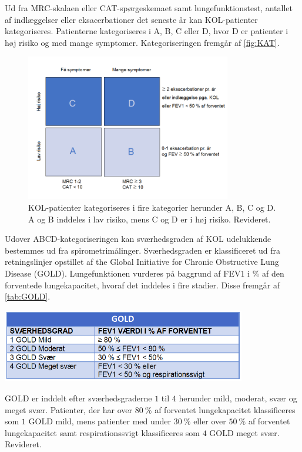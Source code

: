 \noindent
Ud fra MRC-skalaen eller CAT-spørgeskemaet samt lungefunktionstest, antallet af indlæggelser eller eksacerbationer det seneste år kan KOL-patienter kategoriseres. Patienterne kategoriseres i A, B, C eller D, hvor D er patienter i høj risiko og med mange symptomer. Kategoriseringen fremgår af \autoref{fig:KAT}.

\begin{figure} [H]
\centering
\includegraphics[width=0.8\textwidth]{figures/KAT}
\caption{KOL-patienter kategoriseres i fire kategorier herunder A, B, C og D. A og B inddeles i lav risiko, mens C og D er i høj risiko. Revideret\cite{Basisbogen2016}.}
\label{fig:KAT}
\end{figure} 
 
\noindent
Udover ABCD-kategoriseringen kan sværhedsgraden af KOL udelukkende bestemmes ud fra spirometrimålinger.  Sværhedsgraden er klassificeret ud fra retningslinjer opstillet af the Global Initiative for Chronic Obstructive Lung Disease (GOLD).\cite{dsam2016} Lungefunktionen vurderes på baggrund af FEV$1$ i \% af den forventede lungekapacitet, hvoraf det inddeles i fire stadier. Disse fremgår af \autoref{tab:GOLD}.

\begin{table} [H]
\centering
\includegraphics[width=0.8\textwidth]{figures/GOLD}
\caption{GOLD er inddelt efter sværhedsgraderne $1$ til $4$ herunder mild, moderat, svær og meget svær. Patienter, der har over $80~\%$ af forventet lungekapacitet klassificeres som $1$ GOLD mild, mens patienter med under $30~\%$ eller over $50~\%$ af forventet lungekapacitet samt respirationssvigt klassificeres som $4$ GOLD meget svær. Revideret\cite{Basisbogen2016}.}
\label{tab:GOLD}
\end{table} 

